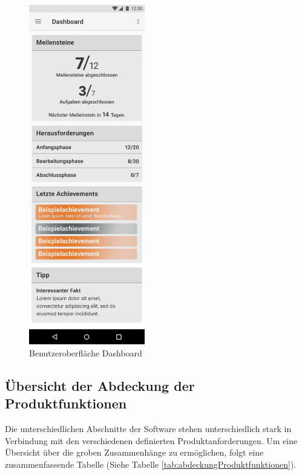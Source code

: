 \documentclass[bibliography=totoc,listof=totoc,BCOR=5mm,DIV=12,oneside]{scrbook}
\begin{document}
\begin{figure}[H]
	\centering
	\includegraphics[width=0.45\textwidth,keepaspectratio]{Bilder/Prototyp/Dashboard.png}
	\caption{Benutzeroberfläche Dashboard}
	\label{img:dashboard}
\end{figure}


\newpage
\subsection{Übersicht der Abdeckung der Produktfunktionen}
\par Die unterschiedlichen Abschnitte der Software stehen unterschiedlich stark in Verbindung mit den verschiedenen definierten Produktanforderungen. Um eine Übersicht über die groben Zusammenhänge zu ermöglichen, folgt eine zusammenfassende Tabelle (Siehe Tabelle \ref{tab:abdeckungProduktfunktionen}).
\bigskip
\end{document}
